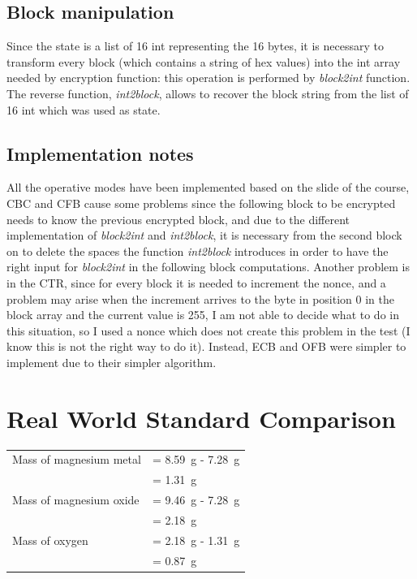 \documentclass{article}
\begin{document}
\subsection{Block manipulation}

Since the state is a list of 16 int representing the 16 bytes, it is necessary to transform every block (which contains a string of hex values) into the int array needed by encryption function: this operation is performed by \textit{block2int} function. The reverse function, \textit{int2block}, allows to recover the block string from the list of 16 int which was used as state.  

\subsection{Implementation notes}

All the operative modes have been implemented based on the slide of the course, CBC and CFB cause some problems since the following block to be encrypted needs to know the previous encrypted block, and due to the different implementation of \textit{block2int} and \textit{int2block}, it is necessary from the second block on to delete the spaces the function \textit{int2block} introduces in order to have the right input for \textit{block2int} in the following block computations.
\newline
Another problem is in the CTR, since for every block it is needed to increment the nonce, and a problem may arise when the increment arrives to the byte in position 0 in the block array and the current value is 255, I am not able to decide what to do in this situation, so I used a nonce which does not create this problem in the test (I know this is not the right way to do it).
\newline
Instead, ECB and OFB were simpler to implement due to their simpler algorithm.




\section{Real World Standard Comparison}

\begin{tabular}{ll}
Mass of magnesium metal & = \SI{8.59}{\gram} - \SI{7.28}{\gram}\\
& = \SI{1.31}{\gram}\\
Mass of magnesium oxide & = \SI{9.46}{\gram} - \SI{7.28}{\gram}\\
& = \SI{2.18}{\gram}\\
Mass of oxygen & = \SI{2.18}{\gram} - \SI{1.31}{\gram}\\
& = \SI{0.87}{\gram}
\end{tabular}
\end{document}
